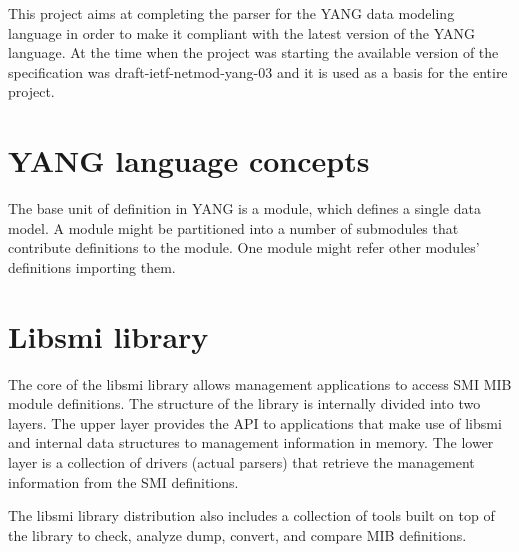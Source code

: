 \documentclass[conference]{IEEEtran}
\begin{document}
This project aims at completing the parser for the YANG data modeling language in order to make it compliant with the latest version of the YANG language. At the time when the project was starting the available version of the specification was draft-ietf-netmod-yang-03 \cite{bib3} and it is used as a basis for the entire project.

\section{YANG language concepts}
The base unit of definition in YANG is a module, which defines a single data model. A module might be partitioned into a number of submodules that contribute definitions to the module. One module might refer other modules' definitions importing them. 

\section{Libsmi library}
The core of the libsmi library allows management applications to access SMI MIB module definitions. The structure of the library \cite{bib7} is internally divided into two layers. The upper layer provides the API to applications that make use of libsmi and internal data structures to management information in memory. The lower layer is a collection of drivers (actual parsers) that retrieve the management information from the SMI definitions. 

The libsmi library distribution also includes a collection of tools built on top of the library to check, analyze dump, convert, and compare MIB definitions.
\end{document}
